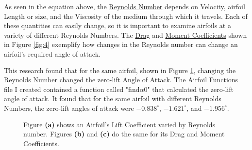 \documentclass{article}
\begin{document}
As seen in the equation above, the \hyperlink{Re}{Reynolds Number} depends on Velocity, airfoil Length or size, and the Viscosity of the medium through which it travels. Each of these quantities can easily change, so it is important to examine airfoils at a variety of different Reynolds Numbers. The \hyperlink{CD}{Drag} and \hyperlink{CM}{Moment Coefficients} shown in Figure \ref{fig:4} exemplify how changes in the Reynolds number can change an airfoil's required angle of attack. \newline

This research found that for the same airfoil, shown in Figure \ref{fig:3}, changing the \hyperlink{Re}{Reynolds Number} changed the zero-lift \hyperlink{alpha}{Angle of Attack}. The Airfoil Functions file I created contained a function called "find$\alpha$0" that calculated the zero-lift angle of attack. It found that for the same airfoil with different  Reynolds Numbers, the zero-lift angles of attack were $-0.838^{\circ}$, $-1.621^{\circ}$, and $-1.956^{\circ}$. \newline

\begin{figure}[!htb]
  \centering
  \caption{Figure \textbf{(a)} shows an Airfoil's Lift Coefficient varied by Reynolds number. Figures \textbf{(b)} and \textbf{(c)} do the same for its Drag and Moment Coefficients.}
  \label{fig:3}
\end{figure}
\end{document}
